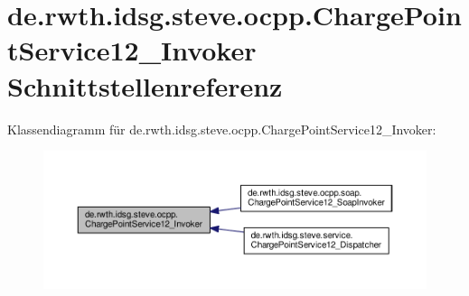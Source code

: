 \hypertarget{interfacede_1_1rwth_1_1idsg_1_1steve_1_1ocpp_1_1_charge_point_service12___invoker}{\section{de.\-rwth.\-idsg.\-steve.\-ocpp.\-Charge\-Point\-Service12\-\_\-\-Invoker Schnittstellenreferenz}
\label{interfacede_1_1rwth_1_1idsg_1_1steve_1_1ocpp_1_1_charge_point_service12___invoker}
}


Klassendiagramm für de.\-rwth.\-idsg.\-steve.\-ocpp.\-Charge\-Point\-Service12\-\_\-\-Invoker\-:\nopagebreak
\begin{figure}[H]
\begin{center}
\leavevmode
\includegraphics[width=350pt]{interfacede_1_1rwth_1_1idsg_1_1steve_1_1ocpp_1_1_charge_point_service12___invoker__inherit__graph}
\end{center}
\end{figure}
